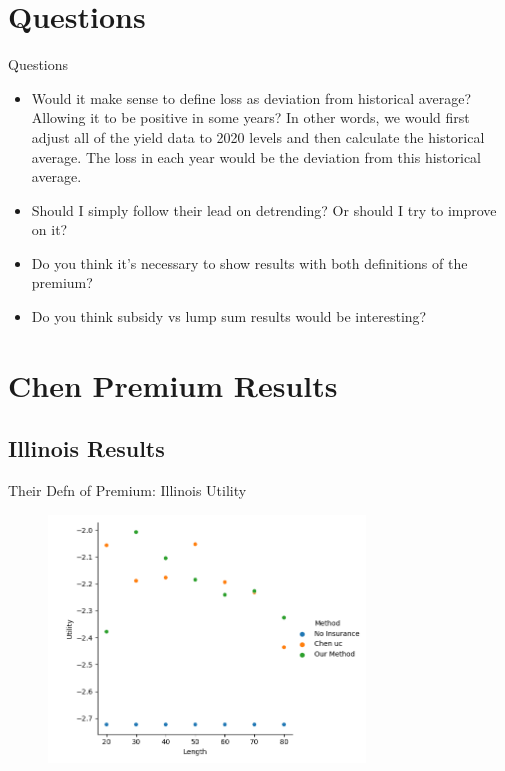 \documentclass{beamer}
\begin{document}
\section*{Questions}
\begin{frame}{Questions}
    \begin{itemize}
        \item Would it make sense to define loss as deviation from historical average? Allowing it to be positive in some years? In other words, we would first adjust all of the yield data to 2020 levels and then calculate the historical average. The loss in each year would be the deviation from this historical average. 
        \item Should I simply follow their lead on detrending? Or should I try to improve on it?
        \item Do you think it's necessary to show results with both definitions of the premium?
        \item Do you think subsidy vs lump sum results would be interesting?
    \end{itemize}
\end{frame}

\section*{Chen Premium Results}
\subsection*{Illinois Results}
\begin{frame}{Their Defn of Premium: Illinois Utility}
    \begin{figure}
        \includegraphics[width=0.75\textwidth]{../../../output/figures/Chen Premium/Illinois_Utility_Length_ml1241.png}
    \end{figure}
\end{frame}
\end{document}
